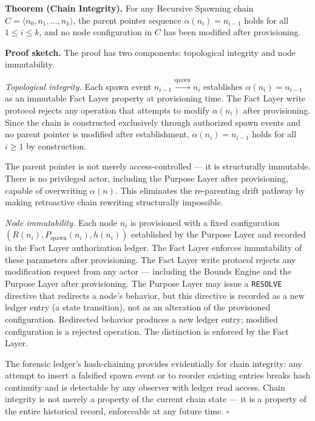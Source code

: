 \medskip
\noindent\textbf{Theorem (Chain Integrity).} For any Recursive Spawning chain $C = \langle n_0, n_1, \ldots, n_k \rangle$, the parent pointer sequence $\alpha(n_i) = n_{i-1}$ holds for all $1 \leq i \leq k$, and no node configuration in $C$ has been modified after provisioning.

\medskip
\noindent\textbf{Proof sketch.} The proof has two components: topological integrity and node immutability.

\medskip
\textit{Topological integrity.} Each spawn event $n_{i-1} \xrightarrow{\mathrm{spawn}} n_i$ establishes $\alpha(n_i) = n_{i-1}$ as an immutable Fact Layer property at provisioning time. The Fact Layer write protocol rejects any operation that attempts to modify $\alpha(n_i)$ after provisioning. Since the chain is constructed exclusively through authorized spawn events and no parent pointer is modified after establishment, $\alpha(n_i) = n_{i-1}$ holds for all $i \geq 1$ by construction.

The parent pointer is not merely access-controlled — it is structurally immutable. There is no privileged actor, including the Purpose Layer after provisioning, capable of overwriting $\alpha(n)$. This eliminates the re-parenting drift pathway by making retroactive chain rewriting structurally impossible.

\medskip
\textit{Node immutability.} Each node $n_i$ is provisioned with a fixed configuration $(R(n_i), P_{\mathrm{spawn}}(n_i), h(n_i))$ established by the Purpose Layer and recorded in the Fact Layer authorization ledger. The Fact Layer enforces immutability of these parameters after provisioning. The Fact Layer write protocol rejects any modification request from any actor — including the Bounds Engine and the Purpose Layer after provisioning. The Purpose Layer may issue a \texttt{RESOLVE} directive that redirects a node's behavior, but this directive is recorded as a new ledger entry (a state transition), not as an alteration of the provisioned configuration. Redirected behavior produces a new ledger entry; modified configuration is a rejected operation. The distinction is enforced by the Fact Layer.

\medskip
The forensic ledger's hash-chaining provides evidentially for chain integrity: any attempt to insert a falsified spawn event or to reorder existing entries breaks hash continuity and is detectable by any observer with ledger read access. Chain integrity is not merely a property of the current chain state — it is a property of the entire historical record, enforceable at any future time. $\square$

